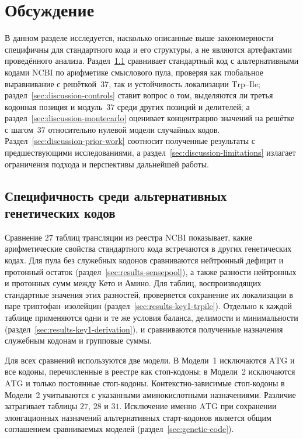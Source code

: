 \documentclass[11pt,a4paper]{article}
\renewcommand{\_}{\origunderscore\allowbreak}
\begin{document}
\section{Обсуждение}
\label{sec:discussion}

В данном разделе исследуется, насколько описанные выше
закономерности специфичны для стандартного кода и его
структуры, а не являются артефактами проведённого анализа.
Раздел~\ref{sec:discussion-trpile-robustness} сравнивает
стандартный код с альтернативными кодами NCBI по
арифметике смыслового пула, проверяя как глобальное
выравнивание с решёткой~$37$, так и устойчивость
локализации $\mathrm{Trp}$--$\mathrm{Ile}$;
раздел~\ref{sec:discussion-controls} ставит вопрос о том,
выделяются ли третья кодонная позиция и модуль~$37$ среди
других позиций и делителей; а
раздел~\ref{sec:discussion-montecarlo} оценивает
концентрацию значений на решётке с шагом~$37$ относительно
нулевой модели случайных кодов. Раздел~\ref{sec:discussion-prior-work}
соотносит полученные результаты с предшествующими исследованиями, а
раздел~\ref{sec:discussion-limitations} излагает
ограничения подхода и перспективы дальнейшей работы.

\subsection{Специфичность среди альтернативных генетических кодов}
\label{sec:discussion-trpile-robustness}
\label{sec:results-key1-ncbi}

Сравнение $27$ таблиц трансляции из реестра NCBI
показывает, какие арифметические свойства стандартного
кода встречаются в других генетических кодах.
Для пула без служебных кодонов сравниваются
нейтронный дефицит и протонный остаток
(раздел~\ref{sec:results-sensepool}),
а также разности нейтронных и протонных сумм
между Кето и Амино. Для таблиц, воспроизводящих
стандартные значения этих разностей, проверяется
сохранение их локализации в паре
триптофан--изолейцин
(раздел~\ref{sec:results-key1-trpile}).
Отдельно к каждой таблице применяются одни и те же
условия баланса, делимости и минимальности
(раздел~\ref{sec:results-key1-derivation}), и
сравниваются полученные назначения служебным кодонам
и групповые суммы.

Для всех сравнений используются две модели.
В Модели~1 исключаются
$\mathrm{ATG}$ и все кодоны, перечисленные в реестре
как стоп-кодоны; в Модели~2 исключаются $\mathrm{ATG}$
и только постоянные стоп-кодоны. Контекстно-зависимые
стоп-кодоны в Модели~2 учитываются с указанными
аминокислотными назначениями. Различие затрагивает
таблицы $27$, $28$ и $31$. Исключение именно
$\mathrm{ATG}$ при сохранении элонгационных назначений
альтернативных старт-кодонов является общим соглашением
сравниваемых моделей
(раздел~\ref{sec:genetic-code}).
\end{document}
